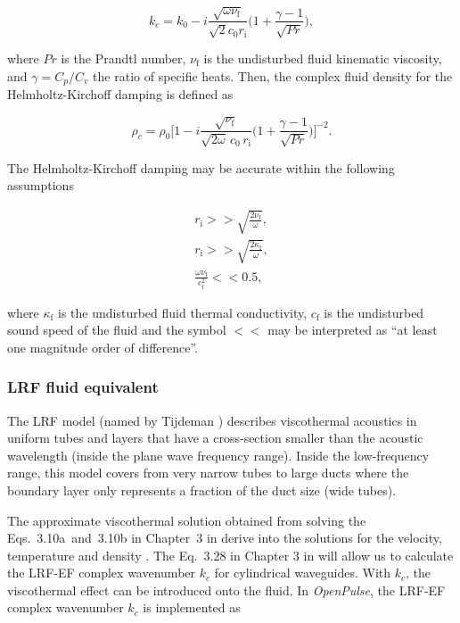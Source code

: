 \documentclass[12pt]{article}
\begin{document}
\begin{equation} \label{eq:complex_wavenumber_wideduct}
	k_c = k_0 - i\frac{\sqrt{\omega \nu_{\text{f}}} }{\sqrt{2}c_{0} r_{\text{i}}} \big( 1 + \frac{\gamma-1}{\sqrt{Pr}} \big),
\end{equation}

\noindent where $Pr$ is the Prandtl number, $\nu_{\text{f}}$ is the undisturbed fluid kinematic viscosity, and $\gamma = C_p/C_v$ the ratio of specific heats. Then, the complex fluid density for the Helmholtz-Kirchoff damping is defined as

\begin{equation}
	\rho_{c} = \rho_{0} \Big[ 1 - i \frac{ \sqrt{ \nu_{\text{f}} } }{ \sqrt{2 \omega } \, c_{0} \,  r_{\text{i}} } \Big( 1 + \frac{\gamma-1}{\sqrt{Pr}} \Big) \Big]^{-2}.
\end{equation}

\noindent The Helmholtz-Kirchoff damping may be accurate within the following assumptions \cite{temkin1981elements}

\begin{gather}
	r_{\text{i}} >> \sqrt{\frac{ 2 \nu_{\text{f}} }{\omega}}, \\
	r_{\text{i}} >> \sqrt{\frac{ 2 \kappa_{\text{f}} }{\omega}}, \\
	\frac{\omega \nu_{\text{f}} }{ c_{\text{f}}^2 } << 0.5,	
\end{gather}

\noindent where $\kappa_{\text{f}}$ is the undisturbed fluid thermal conductivity, $c_{\text{f}}$ is the undisturbed sound speed of the fluid  and the symbol $<<$ may be interpreted as ``at least one magnitude order of difference''.

\subsubsection{LRF fluid equivalent} \label{subsubsec:lrf_damp}

The \acrfull{LRF} model (named by Tijdeman \cite{TIJDEMAN19751}) describes viscothermal acoustics in uniform tubes and layers that have a cross-section smaller than the acoustic wavelength (inside the plane wave frequency range). Inside the low-frequency range, this model covers from very narrow tubes to large ducts where the boundary layer only represents a fraction of the duct size (wide tubes).

The approximate viscothermal solution obtained from solving the Eqs.~3.10a~and~3.10b in Chapter~3 in \cite{kampinga_phdthesis} derive into the solutions for the velocity, temperature and density \cite[Eqs.~3.27 in Chapter~3 in][]{kampinga_phdthesis}. The Eq.~3.28 in Chapter 3 in \cite{kampinga_phdthesis} will allow us to calculate the \acrfull{LRF-EF} complex wavenumber $k_c$ for cylindrical waveguides. With $k_c$, the viscothermal effect can be introduced onto the fluid. In \textit{OpenPulse}, the \acrshort{LRF-EF} complex wavenumber $k_c$ is implemented as
\end{document}
